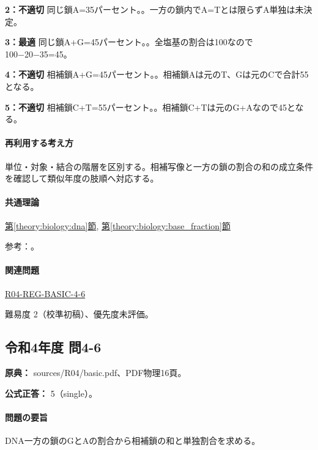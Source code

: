 \noindent\textbf{2：不適切} 同じ鎖A=\allowbreak{}35パーセント。。一方の鎖内でA=\allowbreak{}Tとは限らずA単独は未決定。\par

\noindent\textbf{3：最適} 同じ鎖A+G=\allowbreak{}45パーセント。。全塩基の割合は100なので100−20−35=\allowbreak{}45。\par

\noindent\textbf{4：不適切} 相補鎖A+G=\allowbreak{}45パーセント。。相補鎖Aは元のT、Gは元のCで合計55となる。\par

\noindent\textbf{5：不適切} 相補鎖C+T=\allowbreak{}55パーセント。。相補鎖C+Tは元のG+Aなので45となる。\par

\paragraph{再利用する考え方} 単位・対象・結合の階層を区別する。相補写像と一方の鎖の割合の和の成立条件を確認して類似年度の肢順へ対応する。

\paragraph{共通理論} \hyperref[theory:biology:dna]{第\ref*{theory:biology:dna}節}, \hyperref[theory:biology:base_fraction]{第\ref*{theory:biology:base_fraction}節}

\par 参考：\cite{nhgri_dna}。

\paragraph{関連問題} \hyperref[q:r04-reg-basic-4-6]{R04-REG-BASIC-4-6}

\par 難易度 2（校準初稿）、優先度未評価。

\subsection{令和4年度 問4-6}
\label{q:r04-reg-basic-4-6}

\noindent\textbf{原典：} sources/R04/basic.pdf、PDF物理16頁。

\textbf{公式正答：} 5（single）。

\paragraph{問題の要旨} DNA一方の鎖のGとAの割合から相補鎖の和と単独割合を求める。

